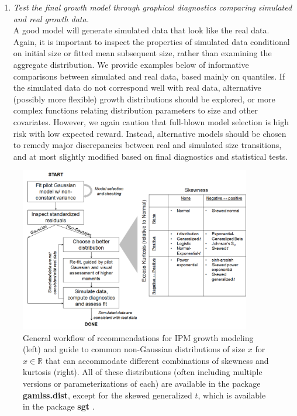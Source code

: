 \documentclass[12pt]{article}
\begin{document}
\begin{enumerate}[label=\arabic*., listparindent=1.5em]
\item \textit{Test the final growth model through graphical diagnostics comparing simulated and real growth data.} 
\\
A good model will generate simulated data that look like the real data.  
Again, it is important to inspect the properties of simulated data conditional on initial size or fitted mean subsequent size, rather than examining the aggregate distribution.   
We provide examples below of informative comparisons between simulated and real data, based mainly on quantiles. 
If the simulated data do not correspond well with real data, alternative (possibly more flexible) growth distributions should be explored, or more complex functions relating distribution parameters to size and other covariates. 
However, we again caution that full-blown model selection is high risk with low expected reward. 
Instead, alternative models should be chosen to remedy major discrepancies between real and simulated size transitions, and at most slightly modified based on final diagnostics and statistical tests.

\end{enumerate}

\begin{figure}
\centering
\includegraphics[width=0.9\textwidth]{figures/workflow.png}
\caption{General workflow of recommendations for IPM growth modeling (left) and guide to common non-Gaussian distributions of size $x$ for $x \in \mathbb{R}$ that can accommodate different combinations of skewness and kurtosis (right). 
All of these distributions (often including multiple versions or parameterizations of each) are available in the package \textbf{gamlss.dist}, 
except for the skewed generalized $t$, which is available in the package \textbf{sgt} \citep{davis-2015}.}
\label{fig:workflow}
\end{figure} 
\end{document}
